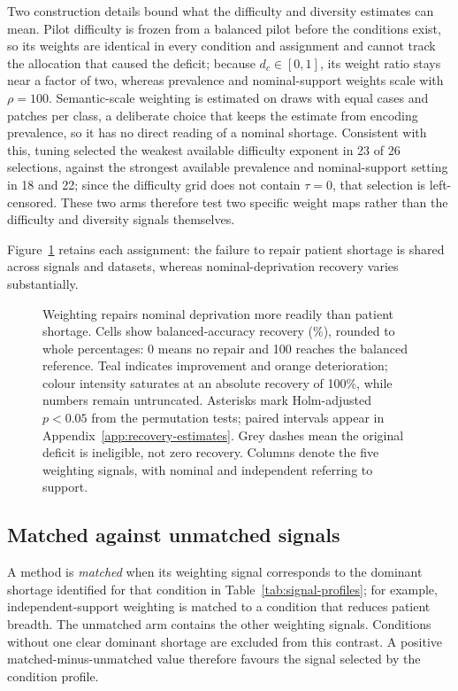 \documentclass[11pt]{article}
\begin{document}
Two construction details bound what the difficulty and diversity estimates can mean. Pilot difficulty is frozen from a balanced pilot before the conditions exist, so its weights are identical in every condition and assignment and cannot track the allocation that caused the deficit; because $d_c\in[0,1]$, its weight ratio stays near a factor of two, whereas prevalence and nominal-support weights scale with $\rho=100$. Semantic-scale weighting is estimated on draws with equal cases and patches per class, a deliberate choice that keeps the estimate from encoding prevalence, so it has no direct reading of a nominal shortage. Consistent with this, tuning selected the weakest available difficulty exponent in \num{23} of \num{26} selections, against the strongest available prevalence and nominal-support setting in \num{18} and \num{22}; since the difficulty grid does not contain $\tau=0$, that selection is left-censored. These two arms therefore test two specific weight maps rather than the difficulty and diversity signals themselves.

Figure~\ref{fig:recovery-overview} retains each assignment: the failure to repair patient shortage is shared across signals and datasets, whereas nominal-deprivation recovery varies substantially.

\begin{figure}[p]
\centering

\caption{Weighting repairs nominal deprivation more readily than patient shortage. Cells show balanced-accuracy recovery (\%), rounded to whole percentages: 0 means no repair and 100 reaches the balanced reference. Teal indicates improvement and orange deterioration; colour intensity saturates at an absolute recovery of 100\%, while numbers remain untruncated. Asterisks mark Holm-adjusted $p<0.05$ from the permutation tests; paired intervals appear in Appendix~\ref{app:recovery-estimates}. Grey dashes mean the original deficit is ineligible, not zero recovery. Columns denote the five weighting signals, with nominal and independent referring to support.}
\label{fig:recovery-overview}
\end{figure}

\subsection{Matched against unmatched signals}
\label{sec:rq2-matched}
A method is \emph{matched} when its weighting signal corresponds to the dominant shortage identified for that condition in Table~\ref{tab:signal-profiles}; for example, independent-support weighting is matched to a condition that reduces patient breadth. The unmatched arm contains the other weighting signals. Conditions without one clear dominant shortage are excluded from this contrast. A positive matched-minus-unmatched value therefore favours the signal selected by the condition profile.
\end{document}
